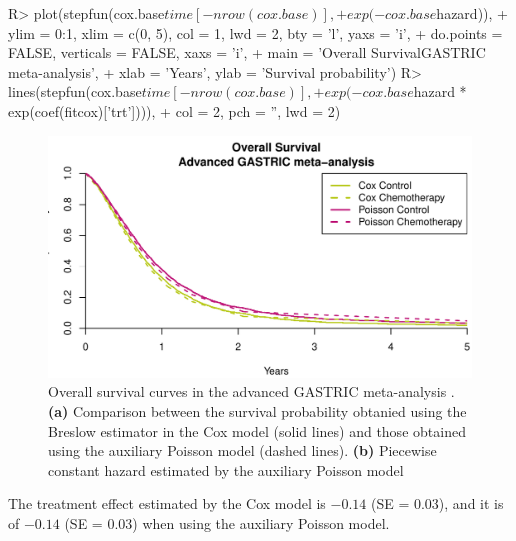 \documentclass[article,shortnames, nojss]{jss}\usepackage[]{graphicx}\usepackage[]{color}
\begin{document}
\begin{Schunk}
\begin{Sinput}
R>   plot(stepfun(cox.base$time[-nrow(cox.base)], 
+                exp(-cox.base$hazard)),
+        ylim = 0:1, xlim = c(0, 5), col = 1, lwd = 2, bty = 'l', yaxs = 'i',
+        do.points = FALSE, verticals = FALSE, xaxs = 'i',
+        main = 'Overall Survival\nAdvanced GASTRIC meta-analysis',
+        xlab = 'Years', ylab = 'Survival probability')
R>   lines(stepfun(cox.base$time[-nrow(cox.base)],
+                exp(-cox.base$hazard * exp(coef(fitcox)['trt']))),
+        col = 2, pch = '', lwd = 2)
\end{Sinput}
\begin{figure}
\includegraphics[width=\textwidth]{./poissonize-1} \caption{Overall survival curves in the advanced GASTRIC meta-analysis \citep{GASTRIC13}. \textbf{(a)} Comparison between the survival probability obtanied using the Breslow estimator in the Cox model (solid lines) and those obtained using the auxiliary Poisson model (dashed lines). \textbf{(b)} Piecewise constant hazard estimated by the auxiliary Poisson model}\label{fig:poissonize}
\end{figure}
\end{Schunk}
The treatment effect estimated by the Cox model is
  \ensuremath{-0.14} (SE = 0.03), 
  and it is of 
  \ensuremath{-0.14} 
  (SE = 0.03)
  when using the auxiliary Poisson model.
\end{document}
